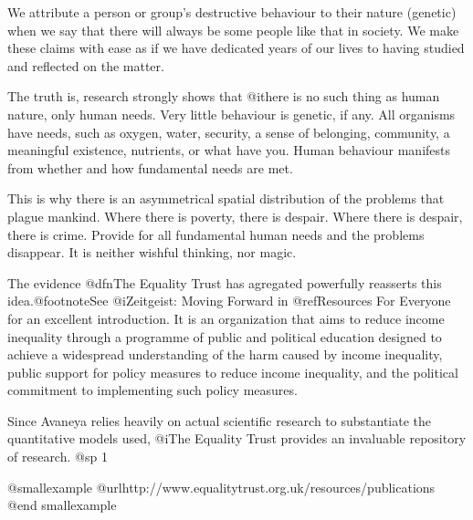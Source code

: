 
We attribute a person or group's destructive behaviour to their nature (genetic) when we say that there will always be some people like that in society. We make these claims with ease as if we have dedicated years of our lives to having studied and reflected on the matter.

The truth is, research strongly shows that @i{there is no such thing as human nature, only human needs}. Very little behaviour is genetic, if any. All organisms have needs, such as oxygen, water, security, a sense of belonging, community, a meaningful existence, nutrients, or what have you. Human behaviour manifests from whether and how fundamental needs are met.

This is why there is an asymmetrical spatial distribution of the problems that plague mankind. Where there is poverty, there is despair. Where there is despair, there is crime. Provide for all fundamental human needs and the problems disappear. It is neither wishful thinking, nor magic.

The evidence @dfn{The Equality Trust} has agregated powerfully reasserts this idea.@footnote{See @i{Zeitgeist: Moving Forward} in @ref{Resources For Everyone} for an excellent introduction.} It is an organization that aims to reduce income inequality through a programme of public and political education designed to achieve a widespread understanding of the harm caused by income inequality, public support for policy measures to reduce income inequality, and the political commitment to implementing such policy measures. 

Since Avaneya relies heavily on actual scientific research to substantiate the quantitative models used, @i{The Equality Trust} provides an invaluable repository of research.
@sp 1

@smallexample
@url{http://www.equalitytrust.org.uk/resources/publications}
@end smallexample

